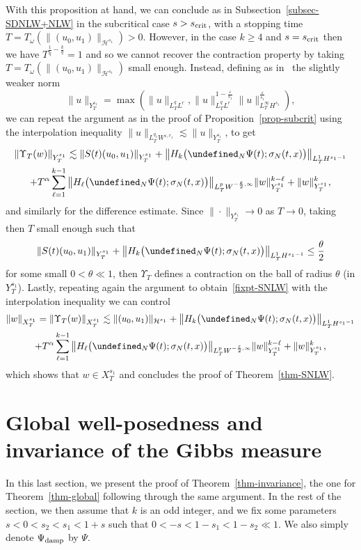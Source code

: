 \documentclass[AHL,Unicode,longabstracts,published]{cedram}
\newcommand{\scrit}{s_{\textup{crit}}}
\newcommand{\damp}{\textup{damp}}
\let\P= \undefined
\newcommand{\P}{\mathbf{P}}
\renewcommand{\H}{\mathcal{H}}
\newcommand{\al}{\alpha}
\newcommand{\eps}{\varepsilon}
\newcommand{\s}{\sigma}
\renewcommand{\o}{\omega}
\newcommand{\les}{\lesssim}
\begin{document}
With this proposition at hand, we can conclude as in Subsection~\ref{subsec-SDNLW+NLW} in the subcritical case $s>\scrit$, with a stopping time $T=T_\o(\|(u_0,u_1)\|_{\H^{s_1}})>0$. However, in the case $k\geq 4$ and $s=\scrit$ then we have $T^{\frac1{\widetilde{q}}-\frac{k}{q}} = 1$ and so we cannot recover the contraction property by taking $T=T_\o(\|(u_0,u_1)\|_{\H^{s_1}})$ small enough. Instead, defining as in~\cite{GKO} the slightly weaker norm
\begin{equation*}
\|u\|_{Y^{s_1}_T}= \max\left(\|u\|_{L^q_TL^r}, \|u\|_{L^q_TL^r}^{1-\frac{\eps}{s_1}}\|u\|_{L^{\infty}_TH^{s_1}}^{\frac{\eps}{s_1}}\right),
\end{equation*}
we can repeat the argument as in the proof of Proposition~\ref{prop-subcrit} using the interpolation inequality $\|u\|_{L^{q_1}_TW^{\eps,r_1}}\les \|u\|_{Y^{s_1}_T}$, to get
\begin{multline*}
\left\|\Upsilon_T(w)\right\|_{Y^{s_1}_T} \les \|S(t)(u_0,u_1)\|_{Y^{s_1}_T} + \big\|H_{k}\big(\P_N\Psi(t);\s_N(t,x)\big)\big\|_{L^1_TH^{s_1-1}}\\ + T^\al\sum_{\ell=1}^{k-1}\big\|H_{\ell}\big(\P_N\Psi(t);\s_N(t,x)\big)\big\|_{L^p_TW^{-\frac\eps2,\infty}}\|w\|_{Y^{s_1}_T}^{k-\ell}+ \|w\|_{Y^{s_1}_T}^k,
\end{multline*}
and similarly for the difference estimate. Since $\|\cdot\|_{Y^{s_1}_T}\rightarrow 0$ as $T\rightarrow 0$, taking then $T$ small enough such that
\begin{equation*}
\|S(t)(u_0,u_1)\|_{Y^{s_1}_T} + \big\|H_{k}\big(\P_N\Psi(t);\s_N(t,x)\big)\big\|_{L^1_TH^{s_1-1}} \leq \frac{\theta}2
\end{equation*}
for some small $0<\theta\ll 1$, then $\Upsilon_T$ defines a contraction on the ball of radius $\theta$ (in $Y^{s_1}_T$). Lastly, repeating again the argument to obtain~\eqref{fixpt-SNLW} with the interpolation inequality we can control
\begin{multline*}
\|w\|_{X^{s_1}_T}=\left\|\Upsilon_T(w)\right\|_{X^{s_1}_T}\les \|(u_0,u_1)\|_{\H^{s_1}} + \left\|H_{k}\big(\P_N\Psi(t);\s_N(t,x)\big)\right\|_{L^1_TH^{s_1-1}}\\ 
+ T^\al\sum_{\ell=1}^{k-1}\big\|H_{\ell}\big(\P_N\Psi(t);\s_N(t,x)\big)\big\|_{L^p_T W^{-\frac\eps2,\infty}}\|w\|_{Y^{s_1}_T}^{k-\ell}+ \|w\|_{Y^{s_1}_T}^k,
\end{multline*}
which shows that $w\in X^{s_1}_T$ and concludes the proof of Theorem~\ref{thm-SNLW}.


\section{Global well-posedness and invariance of the Gibbs measure}\label{sec-global}
In this last section, we present the proof of Theorem~\ref{thm-invariance}, the one for Theorem~\ref{thm-global} following through the same argument. In the rest of the section, we then assume that $k$ is an odd integer, and we fix some parameters $s<0<s_2<s_1<1+s$ such that $0<-s< 1-s_1 < 1-s_2 \ll 1$. We also simply denote $\Psi_\damp$ by $\Psi$.
\end{document}
